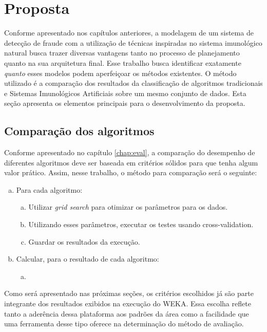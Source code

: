 \chapter{Proposta}

Conforme apresentado nos capítulos anteriores, a modelagem de um sistema de detecção de fraude com a utilização de técnicas inspiradas no sistema imunológico natural busca trazer diversas vantagens tanto no processo de planejamento quanto na sua arquitetura final. Esse trabalho busca identificar exatamente \emph{quanto} esses modelos podem aperfeiçoar os métodos existentes. O método utilizado é a comparação dos resultados da classificação de algoritmos tradicionais e Sistemas Imunológicos Artificiais sobre um mesmo conjunto de dados. Esta seção apresenta os elementos principais para o desenvolvimento da proposta.

\section{Comparação dos algoritmos}

Conforme apresentado no capítulo \ref{chap:eval}, a comparação do desempenho de diferentes algoritmos deve ser baseada em critérios sólidos para que tenha algum valor prático. Assim, nesse trabalho, o método para comparação será o seguinte:

\begin{enumerate}[a)]
    \item Para cada algoritmo:
        \begin{enumerate}[a)]
            \item Utilizar \emph{grid search} para otimizar os parâmetros para os dados.
            \item Utilizando esses parâmetros, executar os testes usando cross-validation.
            \item Guardar os resultados da execução.
        \end{enumerate}
    \item Calcular, para o resultado de cada algoritmo:
        \begin{enumerate}[a)]
            \item 
        \end{enumerate}
\end{enumerate}

Como será apresentado nas próximas seções, os critérios escolhidos já são parte integrante dos resultados exibidos na execução do WEKA. Essa escolha reflete tanto a aderência dessa plataforma aos padrões da área como a facilidade que uma ferramenta desse tipo oferece na determinação do método de avaliação.

